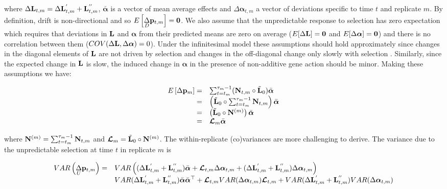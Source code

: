 \documentclass[12pt]{article}
\begin{document}
\begin{bibunit}
where $\Delta{\bf L}_{t,m} =\Delta{\bf L}^{'}_{t,m}+{\bf L}^{''}_{t,m}$, $\bar{\boldsymbol{\alpha}}$ is a vector of mean average effects and $\Delta\boldsymbol{\alpha}_{t,m}$ a vector of deviations specific to time $t$ and replicate $m$. By definition, drift is non-directional and so $E\left[ \underset{D}\Delta {\bf p}_{t, m}\right]={\bf 0}$. We also assume that the unpredictable response to selection has zero expectation which requires that deviations in ${\bf L}$ and $\boldsymbol{\alpha}$ from their predicted means are zero on average ($E[\Delta{\bf L}]={\bf 0}$ and $E[\Delta\boldsymbol{\alpha}]={\bf 0}$) and there is no correlation between them ($COV(\Delta{\bf L}, \Delta\boldsymbol{\alpha})=0$). Under the infinitesimal model these assumptions should hold approximately since changes in the diagonal elements of ${\bf L}$ are not driven by selection \citep{Barton.2017} and changes in the off-diagonal change only slowly with selection \citep{Bulmer.1971}. Similarly, since the expected change in ${\bf L}$ is slow, the induced change in $\boldsymbol{\alpha}$ in the presence of non-additive gene action should be minor. Making these assumptions we have:

\begin{equation}
\begin{array}{rl}
E\left[\Delta {\bf p}_m\right] =& \sum_{t=t_m}^{\tau_m-1}({\bf N}_{t,m}\circ\tilde{\bf L}_0)\bar{\boldsymbol{\alpha}}\\
=& \left(\tilde{\bf L}_0\circ\sum_{t=t_m}^{\tau_m-1}{\bf N}_{t,m}\right)\bar{\boldsymbol{\alpha}}\\
=& \left(\tilde{\bf L}_0\circ{\bf N}^{(m)}\right)\bar{\boldsymbol{\alpha}}\\
=& \boldsymbol{\mathcal L}_m\bar{\boldsymbol{\alpha}}\\
\end{array}
\end{equation}

where ${\bf N}^{(m)}=\sum_{t=t_m}^{\tau_m-1}{\bf N}_{t,m}$ and $\boldsymbol{\mathcal L}_m=\tilde{\bf L}_0\circ{\bf N}^{(m)}$.  The within-replicate (co)variances are more challenging to derive. The variance due to the unpredictable selection at time $t$ in replicate $m$ is 

\begin{tiny}
\begin{equation}
\begin{array}{rl}
VAR\left(\underset{U}\Delta {\bf p}_{t, m}\right)=&VAR\left((\Delta{\bf L}^{'}_{t, m}+{\bf L}^{''}_{t, m})\bar{\boldsymbol{\alpha}}+\boldsymbol{\mathcal L}_{t,m}\Delta\boldsymbol{\alpha}_{t,m}+(\Delta{\bf L}^{'}_{t,m}+{\bf L}^{''}_{t,m})\Delta\boldsymbol{\alpha}_{t, m}\right)\\
&VAR(\Delta{\bf L}^{'}_{t, m}+{\bf L}^{''}_{t, m})\bar{\boldsymbol{\alpha}}\bar{\boldsymbol{\alpha}}^{\top}+\boldsymbol{\mathcal L}_{t,m}VAR(\Delta\boldsymbol{\alpha}_{t,m})\boldsymbol{\mathcal L}_{t,m}+VAR(\Delta{\bf L}^{'}_{t,m}+{\bf L}^{''}_{t,m})VAR(\Delta\boldsymbol{\alpha}_{t, m})\\
\end{array}
\end{equation}
\end{tiny}


\end{bibunit}
\end{document}
